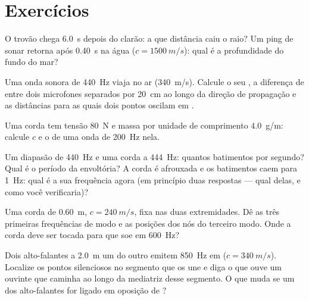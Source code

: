 \section{Exercícios}

\begin{exercise}[$\star$]\label{exo:b1:wave-propagation:1}
O trovão chega \qty{6.0}{s} depois do clarão: a que distância caiu o raio? Um
ping de sonar retorna após \qty{0.40}{s} na água ($c = \qty{1500}{m/s}$):
qual é a profundidade do fundo do mar?
\end{exercise}

\begin{exercise}[$\star$]\label{exo:b1:wave-propagation:2}
Uma onda sonora de \qty{440}{Hz} viaja no ar (\qty{340}{m/s}). Calcule o seu
, a diferença de  entre dois microfones separados por \qty{20}{cm}
ao longo da direção de propagação e as distâncias para as quais
dois pontos oscilam em .
\end{exercise}

\begin{exercise}[$\star$]\label{exo:b1:wave-propagation:3}
Uma corda tem tensão \qty{80}{N} e massa por unidade de comprimento
\qty{4.0}{g/m}: calcule $c$ e o  de uma onda de \qty{200}{Hz}
nela.
\end{exercise}

\begin{exercise}[$\star$]\label{exo:b1:wave-propagation:4}
Um diapasão de \qty{440}{Hz} e uma corda a \qty{444}{Hz}: quantos batimentos por
segundo? Qual é o período da envoltória? A corda
é afrouxada e os batimentos caem para \qty{1}{Hz}: qual é a sua frequência
agora (em princípio duas respostas --- qual delas, e como você verificaria)?
\end{exercise}

\begin{exercise}[$\star\star$]\label{exo:b1:wave-propagation:5}
Uma corda de \qty{0.60}{m}, $c = \qty{240}{m/s}$, fixa nas duas
extremidades. Dê as três primeiras frequências de modo e as posições dos nós do
terceiro modo. Onde a corda deve ser tocada para que soe em
\qty{600}{Hz}?
\end{exercise}

\begin{exercise}[$\star\star$]\label{exo:b1:wave-propagation:6}
Dois alto-falantes a \qty{2.0}{m} um do outro emitem \qty{850}{Hz} em 
($c = \qty{340}{m/s}$). Localize os pontos silenciosos no segmento que os
une e diga o que ouve um ouvinte que caminha ao longo da mediatriz
desse segmento. O que muda se um dos alto-falantes for ligado em oposição de ?
\end{exercise}

